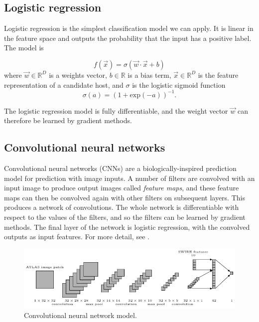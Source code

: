 \documentclass[fleqn,usenatbib,usedcolumn]{mnras}
\begin{document}
  \subsection{Logistic regression}\label{logistic-regression}

    Logistic regression is the simplest classification model we can apply.
    It is linear in the feature space and outputs the probability that the
    input has a positive label. The model is

    \[
        f(\vec x) = \sigma(\vec w \cdot \vec x + b)
    \] where \(\vec w \in \mathbb{R}^D\) is a weights vector,
    \(b \in \mathbb{R}\) is a bias term, \(\vec x \in \mathbb{R}^D\) is the
    feature representation of a candidate host, and \(\sigma\) is the
    logistic sigmoid function \[
        \sigma(a) = (1 + \mathrm{exp}(-a))^{-1}.
    \]

    The logistic regression model is fully differentiable, and the weight vector $\vec w$ can therefore be learned by gradient methods.

  \subsection{Convolutional neural
  networks}\label{convolutional-neural-networks}

    Convolutional neural networks (CNNs) are a biologically-inspired
    prediction model for prediction with image inputs. A number of filters
    are convolved with an input image to produce output images called \emph{feature maps}, and these feature maps can then be convolved again with other filters on subsequent layers. This produces a network of convolutions. The whole network is
    differentiable with respect to the values of the filters, and so the
    filters can be learned by gradient methods. The final layer of the
    network is logistic regression, with the convolved outputs as input
    features. For more detail, see \citet[\S II.A][]{lecun98}.

    \begin{figure}
      \centering
      \includegraphics[width=\textwidth]{convnet.pdf}
      \caption{Convolutional neural network model.}
      \label{fig:cnn}
    \end{figure}
\end{document}
